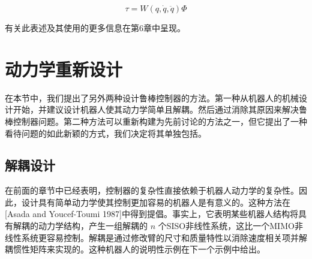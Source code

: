 \documentclass[UTF8,12pt,a4paper]{ctexart}
\begin{document}
\begin{equation}\label{eq:5.3.16}
\tau = W(q, \dot{q}, \ddot{q})\Phi
\end{equation}

有关此表述及其使用的更多信息在第6章中呈现。

\section{动力学重新设计}

在本节中，我们提出了另外两种设计鲁棒控制器的方法。第一种从机器人的机械设计开始，并建议设计机器人使其动力学简单且解耦。然后通过消除其原因来解决鲁棒控制器问题。第二种方法可以重新构建为先前讨论的方法之一，但它提出了一种看待问题的如此新颖的方式，我们决定将其单独包括。

\subsection{解耦设计}

在前面的章节中已经表明，控制器的复杂性直接依赖于机器人动力学的复杂性。因此，设计具有简单动力学使其控制更加容易的机器人是有意义的。这种方法在[Asada and Youcef-Toumi 1987]中得到提倡。事实上，它表明某些机器人结构将具有解耦的动力学结构，产生一组解耦的 $n$ 个SISO非线性系统，这比一个MIMO非线性系统更容易控制。解耦是通过修改臂的尺寸和质量特性以消除速度相关项并解耦惯性矩阵来实现的。这种机器人的说明性示例在下一个示例中给出。
\end{document}
